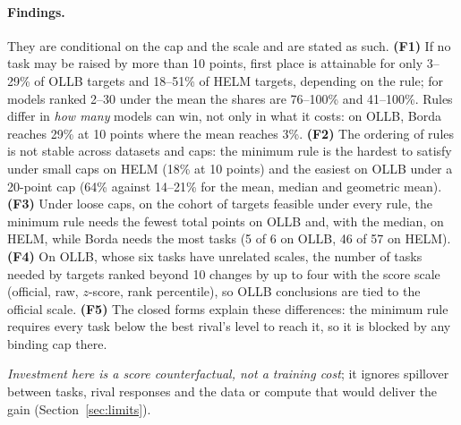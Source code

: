 \paragraph{Findings.}
They are conditional on the cap and the scale and are stated as such.
\textbf{(F1)} If no task may be raised by more than 10 points, first place is attainable for only 3--29\% of OLLB targets and 18--51\% of HELM targets, depending on the rule; for models ranked 2--30 under the mean the shares are 76--100\% and 41--100\%.
Rules differ in \emph{how many} models can win, not only in what it costs: on OLLB, Borda reaches 29\% at 10 points where the mean reaches 3\%.
\textbf{(F2)} The ordering of rules is not stable across datasets and caps: the minimum rule is the hardest to satisfy under small caps on HELM (18\% at 10 points) and the easiest on OLLB under a 20-point cap (64\% against 14--21\% for the mean, median and geometric mean).
\textbf{(F3)} Under loose caps, on the cohort of targets feasible under every rule, the minimum rule needs the fewest total points on OLLB and, with the median, on HELM, while Borda needs the most tasks (5 of 6 on OLLB, 46 of 57 on HELM).
\textbf{(F4)} On OLLB, whose six tasks have unrelated scales, the number of tasks needed by targets ranked beyond 10 changes by up to four with the score scale (official, raw, $z$-score, rank percentile), so OLLB conclusions are tied to the official scale.
\textbf{(F5)} The closed forms explain these differences: the minimum rule requires every task below the best rival's level to reach it, so it is blocked by any binding cap there.

\emph{Investment here is a score counterfactual, not a training cost}; it ignores spillover between tasks, rival responses and the data or compute that would deliver the gain (Section~\ref{sec:limits}).
